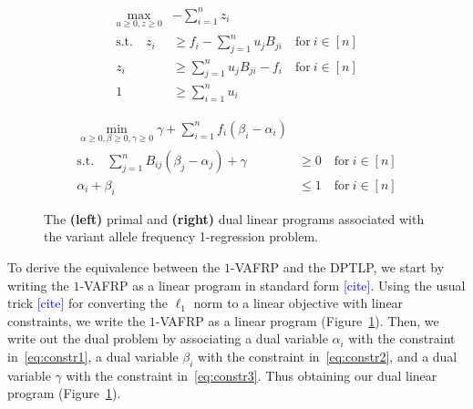 \documentclass[10pt]{article}
\newcommand{\henri}[1]{\textcolor{blue}{[#1]}}
\begin{document}
\begin{figure}
    \begin{tcolorbox}[colback=white,colframe=black]
        \begin{minipage}[t]{0.40\textwidth}
            \begin{align}
                \max_{u \geq 0, z \geq 0} &-\sum_{i=1}^n z_i \nonumber \\
                \text{s.t.}\quad z_i &\geq f_i - \sum_{j=1}^n u_j B_{ji} \quad\text{for}\  i \in [n] \label{eq:constr1} \\
                z_i &\geq \sum_{j=1}^n u_j B_{ji} - f_i \quad\text{for}\  i \in [n] \label{eq:constr2} \\
                1 &\geq \sum_{i=1}^n u_i \label{eq:constr3}
            \end{align}
        \end{minipage}
        \hfill\vline\hfill
        \hspace{-2em}
        \begin{minipage}[t]{0.50\textwidth}
            \begin{align}
                \min_{\alpha \geq 0, \beta \geq 0, \gamma \geq 0} \gamma + \sum_{i=1}^n f_i(\beta_i - \alpha_i) \nonumber \\
                \text{s.t.} \quad 
                \sum_{j=1}^n B_{ij}(\beta_j - \alpha_j) + \gamma &\geq 0 \quad\text{for}\  i \in [n] \label{eq:dualconstr0} \\
                \alpha_i + \beta_i &\leq 1 \quad\text{for}\  i \in [n] \label{eq:dualconstr1}
            \end{align}
        \end{minipage}
    \end{tcolorbox}
    \caption{\label{fig:primal_dual} The \textbf{(left)} primal and \textbf{(right)} dual linear 
    programs associated with the variant allele frequency 1-regression problem.}
\end{figure}

To derive the equivalence between the $1$-VAFRP and the DPTLP, we start by writing the 
$1$-VAFRP as a linear program in standard form \henri{cite}.
Using the usual trick \henri{cite} for converting the $\ell_1$ 
norm to a linear objective with linear constraints, we write the $1$-VAFRP as a 
linear program (Figure~\ref{fig:primal_dual}). Then, we write out the dual problem by associating
a dual variable $\alpha_i$ with the constraint in~\eqref{eq:constr1},
a dual variable $\beta_i$ with the constraint in~\eqref{eq:constr2},
and a dual variable $\gamma$ with the constraint in~\eqref{eq:constr3}.
Thus obtaining our dual linear program (Figure~\ref{fig:primal_dual}).
\end{document}
